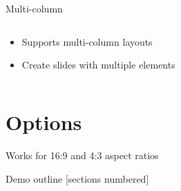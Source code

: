 \documentclass[aspectratio=169,10pt,handout]{beamer}
\begin{document}
\begin{frame}{Multi-column}
    \begin{columns}
        \begin{column}{0.5\linewidth}
            \begin{itemize}
                \item<1-> Supports multi-column layouts
                \item<3-> Create slides with multiple elements
            \end{itemize}
        \end{column}
        \begin{column}{0.5\linewidth}
            \begin{center}
            \end{center}
        \end{column}
    \end{columns}
\end{frame}

\section{Options}

\begin{frame}[standout]
    Works for 16:9 and 4:3 aspect ratios
\end{frame}

\begin{frame}{Demo outline}
  [sections numbered]
  \tableofcontents[hideallsubsections]
\end{frame}
\end{document}
